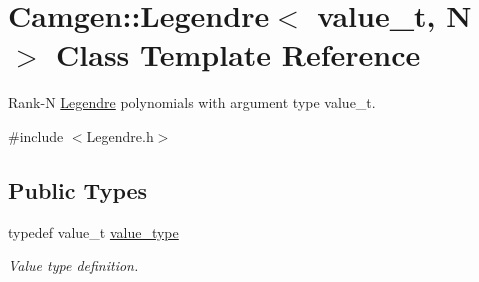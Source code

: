 \hypertarget{a00323}{}\section{Camgen\+:\+:Legendre$<$ value\+\_\+t, N $>$ Class Template Reference}
\label{a00323}


Rank-\/\+N \hyperlink{a00323}{Legendre} polynomials with argument type value\+\_\+t.  




{\ttfamily \#include $<$Legendre.\+h$>$}

\subsection*{Public Types}
\begin{DoxyCompactItemize}
\item 
\hypertarget{a00323_a6eb9a63823f5074b09c8c916818d94e7}{}typedef value\+\_\+t \hyperlink{a00323_a6eb9a63823f5074b09c8c916818d94e7}{value\+\_\+type}\label{a00323_a6eb9a63823f5074b09c8c916818d94e7}

\begin{DoxyCompactList}\small\item\em Value type definition. \end{DoxyCompactList}\end{DoxyCompactItemize}

